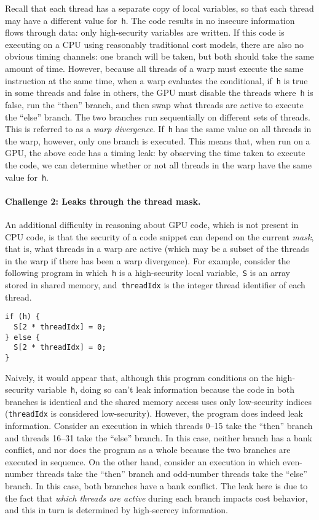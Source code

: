 Recall that each thread has a separate copy of local variables, so that
each thread may have a different value for~\texttt{h}.
%
The code results in no insecure information flows through data: only
high-security variables are written.
%
If this code is executing on a CPU using reasonably traditional cost models,
there are also no obvious timing channels: one branch will be taken, but
both should take the same amount of time.
%
However, because all threads of a warp must execute the same instruction at the same time, when a warp evaluates the conditional, if~\texttt{h} is true in some threads and false in others, the GPU must disable the threads where~\texttt{h} is false, run the ``then'' branch, and then swap what threads are active to execute the ``else'' branch.
%
The two branches run sequentially on different sets of threads.
%
This is referred to as a {\em warp divergence}.
%
If~\texttt{h} has the same value on all threads in the warp, however, only
one branch is executed.
%
This means that, when run on a GPU, the above code has a timing leak: by
observing the time taken to execute the code, we can determine whether or not
all threads in the warp have the same value for~\texttt{h}.

\paragraph{Challenge 2: Leaks through the thread mask.}
An additional difficulty in reasoning about GPU code, which is not present in CPU code, is that the security of a code snippet can depend on the current {\em mask}, that is, what threads in a warp are active (which may be a subset of the threads in the warp if there has been a warp divergence).
%
For example, consider the following program in which~\lstinline{h} is a high-security local variable,~\lstinline{S} is an array stored in shared memory, and~\lstinline{threadIdx} is the integer thread identifier of each thread.

\begin{lstlisting}
if (h) {
  S[2 * threadIdx] = 0;
} else {
  S[2 * threadIdx] = 0;
}
\end{lstlisting}

Naively, it would appear that, although this program conditions on the high-security variable~\lstinline{h}, doing so can't leak information because the code in both branches is identical and the shared memory access uses only low-security indices (\lstinline{threadIdx} is considered low-security).
%
However, the program does indeed leak information.
%
Consider an execution in which threads 0--15 take the ``then'' branch and threads 16--31 take the ``else'' branch.
%
In this case, neither branch has a bank conflict, and nor does the program as a whole because the two branches are executed in sequence.
%
On the other hand, consider an execution in which even-number threads take the ``then'' branch and odd-number threads take the ``else'' branch.
%
In this case, both branches have a bank conflict.
%
The leak here is due to the fact that {\em which threads are active} during each branch impacts cost behavior, and this in turn is determined by high-secrecy information.
%

